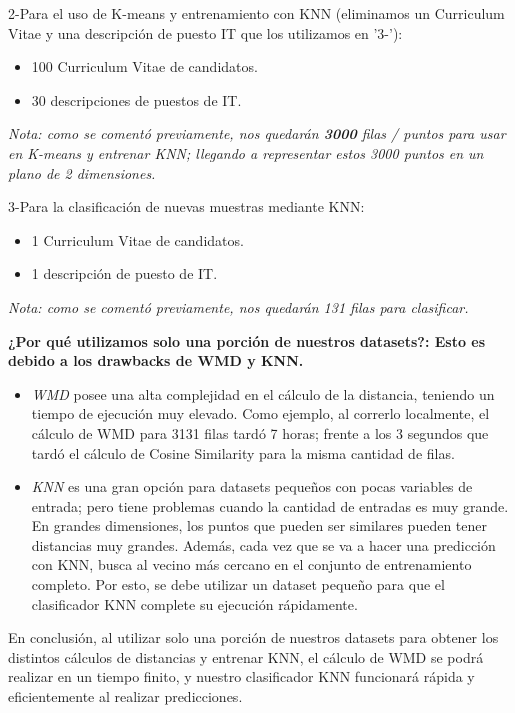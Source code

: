 \documentclass[12pt,a4paper]{article}
\begin{document}
\begin{sloppypar}
2-Para el uso de K-means y entrenamiento con KNN (eliminamos un Curriculum Vitae y una descripción de puesto IT que los utilizamos en '3-'):
\begin{itemize}
\item 100 Curriculum Vitae de candidatos.
\item 30 descripciones de puestos de IT.
\end{itemize}        
\textit{Nota: como se comentó previamente, nos quedarán \textbf{3000} filas / puntos para usar en K-means y entrenar KNN; llegando a representar estos 3000 puntos en un plano de 2 dimensiones.}

3-Para la clasificación de nuevas muestras mediante KNN:
\begin{itemize}
\item 1 Curriculum Vitae de candidatos.
\item 1 descripción de puesto de IT.
\end{itemize}
\textit{Nota: como se comentó previamente, nos quedarán 131 filas para clasificar.}

\cleardoublepage

\textbf{¿Por qué utilizamos solo una porción de nuestros datasets?: Esto es debido a los drawbacks de WMD y KNN.}
\begin{itemize}
\item \textit{WMD} posee una alta complejidad en el cálculo de la distancia, teniendo un tiempo de ejecución muy elevado. Como ejemplo, al correrlo localmente, el cálculo de WMD para 3131 filas tardó 7 horas; frente a los 3 segundos que tardó el cálculo de Cosine Similarity para la misma cantidad de filas.
\item \textit{KNN} es una gran opción para datasets pequeños con pocas variables de entrada; pero tiene problemas cuando la cantidad de entradas es muy grande. En grandes dimensiones, los puntos que pueden ser similares pueden tener distancias muy grandes. Además, cada vez que se va a hacer una predicción con KNN, busca al vecino más cercano en el conjunto de entrenamiento completo. Por esto, se debe utilizar un dataset pequeño para que el clasificador KNN complete su ejecución rápidamente.
\end{itemize}
En conclusión, al utilizar solo una porción de nuestros datasets para obtener los distintos cálculos de distancias y entrenar KNN, el cálculo de WMD se podrá realizar en un tiempo finito, y nuestro clasificador KNN funcionará rápida y eficientemente al realizar predicciones.

\cleardoublepage


\end{sloppypar}
\end{document}

